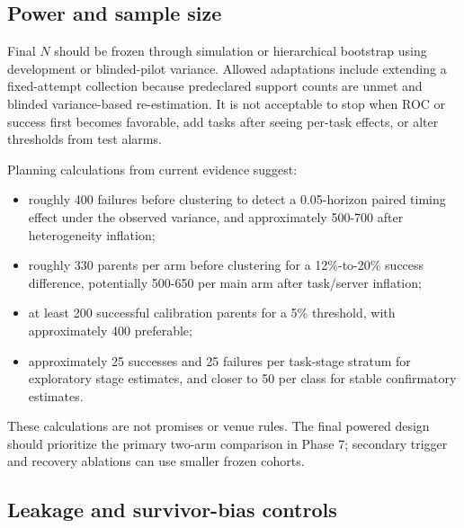 \subsection{Power and sample size}

Final $N$ should be frozen through simulation or hierarchical bootstrap using development or blinded-pilot variance. Allowed adaptations include extending a fixed-attempt collection because predeclared support counts are unmet and blinded variance-based re-estimation. It is not acceptable to stop when ROC or success first becomes favorable, add tasks after seeing per-task effects, or alter thresholds from test alarms.

Planning calculations from current evidence suggest:
\begin{itemize}
  \item roughly 400 failures before clustering to detect a 0.05-horizon paired timing effect under the observed variance, and approximately 500-700 after heterogeneity inflation;
  \item roughly 330 parents per arm before clustering for a 12\%-to-20\% success difference, potentially 500-650 per main arm after task/server inflation;
  \item at least 200 successful calibration parents for a 5\% threshold, with approximately 400 preferable;
  \item approximately 25 successes and 25 failures per task-stage stratum for exploratory stage estimates, and closer to 50 per class for stable confirmatory estimates.
\end{itemize}

These calculations are not promises or venue rules. The final powered design should prioritize the primary two-arm comparison in Phase 7; secondary trigger and recovery ablations can use smaller frozen cohorts.

\subsection{Leakage and survivor-bias controls}

